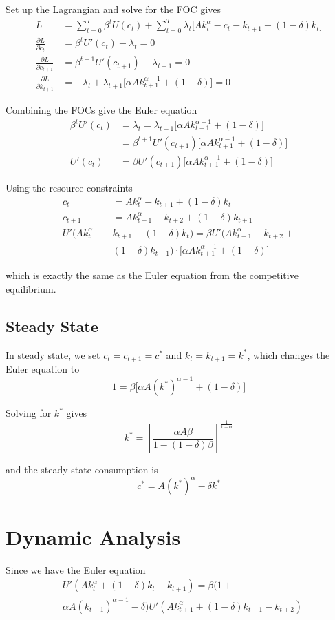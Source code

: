 \documentclass[twocolumn, fleqn]{article}
\begin{document}
	Set up the Lagrangian and solve for the FOC gives
	\begin{align*}
	L &= \sum_{t=0}^T \beta^t U(c_t) + \sum_{t=0}^T \lambda_t \big[A k_t^\alpha - c_t - k_{t+1} + (1 - \delta)k_t\big] \\
	\frac{\partial L}{\partial c_t} &= \beta^t U'(c_t) - \lambda_t = 0 \\
	\frac{\partial L}{\partial c_{t+1}} &= \beta^{t+1} U'(c_{t+1}) - \lambda_{t+1} = 0 \\
	\frac{\partial L}{\partial k_{t+1}} &= -\lambda_t + \lambda_{t+1} \big[\alpha A k_{t+1}^{\alpha - 1} + (1 - \delta)\big] = 0
	\end{align*}
	
	
	Combining the FOCs give the Euler equation
	\begin{align*}
	\beta^t U'(c_t) &= \lambda_t = \lambda_{t+1} \big[\alpha A k_{t+1}^{\alpha - 1} + (1 - \delta)\big] \\
	&= \beta^{t+1} U'(c_{t+1}) \big[\alpha A k_{t+1}^{\alpha - 1} + (1 - \delta)\big] \\[5pt]
	U'(c_t) &= \beta U'(c_{t+1}) \big[\alpha A k_{t+1}^{\alpha - 1} + (1 - \delta)\big]
	\end{align*}
	
	Using the resource constraints 
	\begin{align*}
	c_t &= A k_t^\alpha - k_{t+1} + (1 - \delta)k_t \\
	c_{t+1} &= A k_{t+1}^\alpha - k_{t+2} + (1 - \delta)k_{t+1} \\
	U'(A k_t^\alpha - &k_{t+1} + (1 - \delta)k_t) = \beta U'(A k_{t+1}^\alpha - k_{t+2} +\\& (1 - \delta)k_{t+1}) \cdot \big[\alpha A k_{t+1}^{\alpha - 1} + (1 - \delta)\big]
	\end{align*}
	
	which is exactly the same as the Euler equation from the competitive equilibrium.
	
	\subsection{Steady State}
	In steady state, we set $c_{t} = c_{t+1} = c^\ast$ and $k_t = k_{t+1} =k^\ast$, which changes the Euler equation to 
	\[
	1 = \beta \big[\alpha A (k^*)^{\alpha - 1} + (1 - \delta)\big]
	\]
	
	Solving for $k^\ast$ gives
	\[
	k^* = \left[\frac{\alpha A \beta}{1 - (1 - \delta)\beta}	\right]^{\frac{1}{1 - \alpha}}
	\]
	
	and the steady state consumption is 
	\[ c^\ast = A(k^\ast)^\alpha - \delta k^\ast\]
	
	\section{Dynamic Analysis}
	
	Since we have the Euler equation
	\begin{align*}
		&U'(A k_t^\alpha + (1 - \delta)k_t - k_{t+1}) 
	= \beta (1 + \\
	&\alpha A(k_{t+1})^{\alpha-1} - \delta) 
	U'(A k_{t+1}^\alpha + (1 - \delta)k_{t+1} - k_{t+2})
	\end{align*}
	
	
	
	
	
	
	
	
\end{document}
